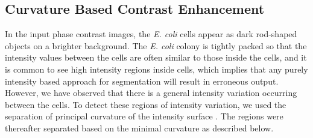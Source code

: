 \documentclass[journal]{IEEEtran}
\begin{document}
\subsection{Curvature Based Contrast Enhancement }
In the input phase contrast images, the \textit{E. coli} cells appear as dark rod-shaped objects on a brighter background. The \textit{E. coli} colony is tightly packed so that the intensity values between the cells are often similar to those inside the cells, and it is common to see high intensity regions inside cells, which implies that any purely intensity based approach for segmentation will result in erroneous output. However, we have observed that there is a general intensity variation occurring between the cells. To detect these regions of intensity variation, we used the separation of principal curvature of the intensity surface \cite {willmoreintroduction1959}. The regions were thereafter separated based on the minimal curvature as described below. 
\end{document}
